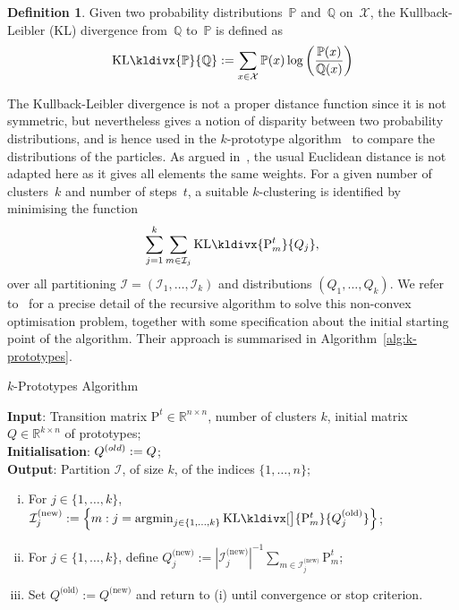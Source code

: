 \documentclass{amsart}[11pt]
\numberwithin{equation}{section}
\theoremstyle{definition}
\newtheorem{definition}[theorem]{Definition}
\newcommand{\Xx}{\mathcal{X}}
\newcommand{\RR}{\mathbb{R}}
\newcommand{\PP}{\mathbb{P}}
\newcommand{\QQ}{\mathbb{Q}}
\newcommand{\Pf}{\mathrm{P}}
\DeclareMathOperator*{\argmin}{\arg\!\min}
\newcommand{\kldiv}{\mathrm{KL}\kldivx}
\begin{document}
\begin{definition}\label{def:kl-divergence}
Given two probability distributions~$\PP$ and~$\QQ$ on~$\Xx$,
the Kullback-Leibler (KL) divergence from~$\QQ$ to~$\PP$ is defined as
$$\kldiv{\PP}{\QQ} := \sum_{x \in \Xx} \PP(x) \log \left( \frac{\PP(x)}{\QQ(x)} \right )$$
\end{definition}

The Kullback-Leibler divergence is not a proper distance function since it is not symmetric,
but nevertheless gives a notion of disparity between two probability distributions,
and is hence used in the $k$-prototype algorithm~\cite{Azran06} to compare the distributions
of the particles.
As argued in~\cite{Azran06}, the usual Euclidean distance is not adapted here as it gives all elements the same weights.
For a given number of clusters~$k$ and number of steps~$t$, a suitable $k$-clustering is identified by minimising the function
$$
\sum_{j=1}^{k}\sum_{m\in\mathcal{I}_j}\kldiv{\Pf^t_m}{Q_j},
$$
over all partitioning $\mathcal{I} = (\mathcal{I}_1,\ldots, \mathcal{I}_k)$ and distributions
$(Q_1,\ldots, Q_k)$.
We refer to~\cite{Azran06} for a precise detail of the recursive algorithm to solve this non-convex optimisation problem, together with some specification about the initial starting point of the algorithm.
Their approach is summarised in Algorithm~\ref{alg:k-prototypes}.

\begin{algorithm}[ht]
    \label{alg:k-prototypes}
    \caption{$k$-Prototypes Algorithm}
    \textbf{Input}: Transition matrix $\Pf^t\in \RR^{n \times n}$, number of clusters $k$, initial matrix $Q \in \RR^{k \times n}$ of prototypes; \\
    \textbf{Initialisation}: $Q^{\textrm(old)} := Q$; \\
    \textbf{Output}: Partition $\mathcal{I}$, of size $k$, of the indices $\{1, \ldots, n\}$;\\
    \begin{enumerate}[(i)]
    \item For $j \in \{1, \ldots, k\}$, $\mathcal{I}_j^{\rm{(new)}} := \left\{ m: j = \argmin_{j \in \{1, \ldots, k\}} \kldiv[\big]{\Pf^t_m}{Q_j^{\rm{(old)}}} \right\}$;
    \item For $j \in \{1, \ldots, k\}$, define
        $Q_j^{\textrm{(new)}} := | \mathcal{I}_j^{\textrm{(new)}}|^{-1}\sum_{m \in \mathcal{I}_{j}^{\textrm{(new)}}} \Pf^t_m$;
    \item Set $Q^{\textrm{(old)}} := Q^{\textrm{(new)}}$ and return to (i) until convergence or stop criterion.
    \end{enumerate}
\end{algorithm}
\end{document}
